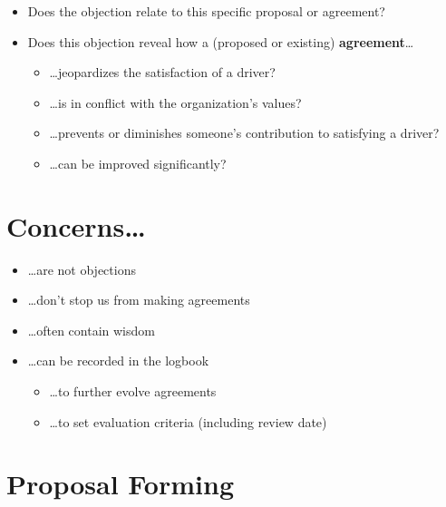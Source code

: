 \begin{itemize}
\item Does the objection relate to this specific proposal or agreement?

\item Does this objection reveal how a (proposed or existing) \textbf{agreement}{\ldots}

\begin{itemize}
\item {\ldots}jeopardizes the satisfaction of a driver?

\item {\ldots}is in conflict with the organization's values?

\item {\ldots}prevents or diminishes someone's contribution to satisfying a driver?

\item {\ldots}can be improved significantly?

\end{itemize}

\end{itemize}

\section{Concerns{\ldots}}
\label{concerns...}

\begin{itemize}
\item {\ldots}are not objections

\item {\ldots}don't stop us from making agreements

\item {\ldots}often contain wisdom

\item {\ldots}can be recorded in the logbook

\begin{itemize}
\item {\ldots}to further evolve agreements

\item {\ldots}to set evaluation criteria (including review date)

\end{itemize}

\end{itemize}

\section{Proposal Forming}
\label{proposalforming}

